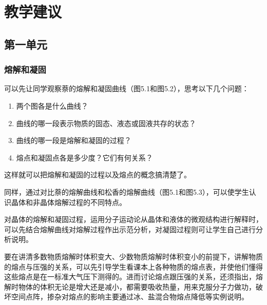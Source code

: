 \section{教学建议}
\subsection{第一单元}
\subsubsection{熔解和凝固} 

可以先让同学观察萘的熔解和凝固曲线（图5.1和图5.2），思考以下几个问题：
\begin{enumerate}
\item 两个图各是什么曲线？    \item 曲线的哪一段表示物质的固态、液态或固液共存的状态？    \item 曲线的哪一段是熔解和凝固的过程？    \item 熔点和凝固点各是多少度？它们有何关系？
\end{enumerate}
这样就可以把熔解和凝固的过程以及熔点的概念搞清楚了。
\begin{figure}[htp]\centering
    \begin{minipage}[t]{0.31\textwidth}
    \centering
    \caption{}
    \end{minipage}
    \begin{minipage}[t]{0.31\textwidth}
    \centering
    \caption{}
    \end{minipage}
    \begin{minipage}[t]{0.31\textwidth}
        \centering
        \caption{}
        \end{minipage}
    \end{figure}

同样，通过对比萘的熔解曲线和松香的熔解曲线（图5.1和图5.3），可以使学生认识晶体和非晶体熔解过程的不同特点。

对晶体的熔解和凝固过程，运用分子运动论从晶体和液体的微观结构进行解释时，可以先结合熔解曲线对熔解过程作出示范分析，对凝固过程则可让学生自己进行分析说明。

要在讲清多数物质熔解时体积变大、少数物质熔解时体积变小的前提下，讲解物质的熔点与压强的关系，可以先引导学生看课本上各种物质的熔点表，并使他们懂得这些熔点是在一标准大气压下测得的。进而讨论熔点跟压强的关系，还须指出，熔解时物体的体积无论是增大还是减小，都需要吸收热量，用来克服分子力做功，破坏空间点阵，掺杂对熔点的影响主要通过冰、盐混合物熔点降低等实例说明。


